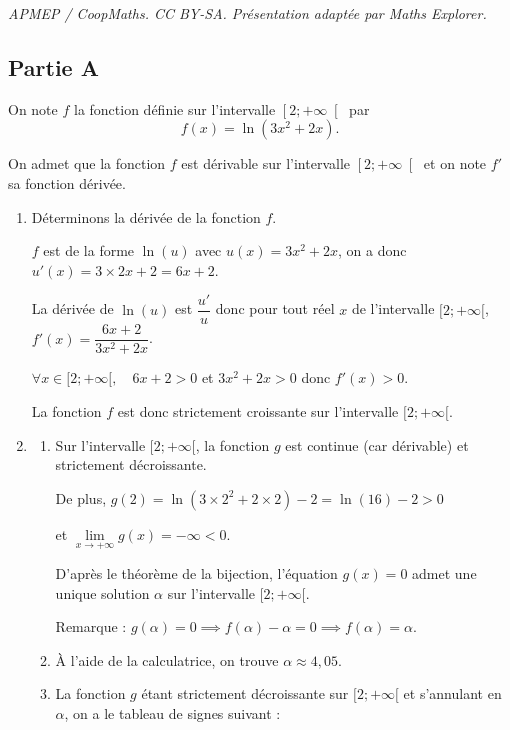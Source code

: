\documentclass[10pt]{article}
\begin{document}
\noindent\textit{APMEP / CoopMaths. CC BY-SA. Présentation adaptée par Maths Explorer.}\par\medskip
\subsection*{Partie A}
On note $f$ la fonction définie sur l'intervalle $\left[2 ;+\infty\right[$ par \[f(x)=\ln \left(3 x^{2}+2 x\right).\]

On admet que la fonction $f$ est dérivable sur l'intervalle $\left[2 ; +\infty \right[$ et on note $f'$ sa fonction dérivée.

\begin{enumerate}
	\item Déterminons la dérivée de la fonction $f$.

	$f$ est de la forme $\ln( u)$ avec $u(x) =3 x^{2}+2 x$, on a donc $u'(x)=3\times 2x+2=6x+2$.

	La dérivée de $\ln(u)$ est $\dfrac{u'}{u}$ donc pour tout réel $x$ de l'intervalle $[2 ;+\infty[$, $f'(x) = \dfrac{6x+2}{3 x^{2}+2 x}$.

	$\forall x \in [2 ;+\infty[,  \quad 6x+2 >0$ et $3x^2+2x >0$ donc $f'(x) >0$.

	La fonction $f$ est donc strictement croissante sur l'intervalle $[2 ;+\infty[$.

	\item
	\begin{enumerate}
		\item  Sur l'intervalle $[2;+\infty[$, la fonction $g$ est continue (car dérivable) et strictement décroissante.

		De plus, $g(2) = \ln( 3\times 2^2+2 \times 2)-2 = \ln(16)-2 >0$

		et $\lim\limits_{x \to +\infty} g(x) =- \infty <0$.

		D'après le théorème de la bijection, l'équation $g(x) =0$ admet une unique solution  $\alpha$  sur l'intervalle $[2;+\infty[$.

		Remarque : $g(\alpha) =0 \implies f(\alpha)-\alpha =0 \implies f(\alpha)=\alpha$.

		\item  À l'aide de la calculatrice, on trouve $\alpha \approx 4,05$.

		\item  La fonction $g$ étant strictement décroissante sur $[2 ;+\infty[$ et s'annulant en $\alpha$, on a le tableau de signes suivant :

		\hfill~
		\hfill~



	\end{enumerate}
\end{enumerate}
\end{document}
